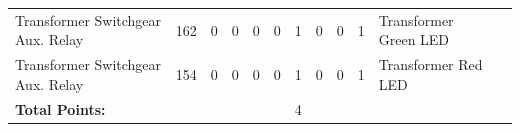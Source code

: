 \begin{table}[!htp]
{\begin{tabular}{lcccccccccll}
			Transformer Switchgear Aux. Relay          & 162                     & 0                                           & 0                                          & 0           & 0           & 1            & 0                & 0 & 1                            & Transformer Green LED            &                \\
			Transformer Switchgear Aux. Relay          & 154                     & 0                                           & 0                                          & 0           & 0           & 1            & 0                & 0 & 1                            & Transformer Red LED              &                \\ \midrule
			\textbf{Total Points:}                     &                         &                                             &                                            &             &             & 4            &                  &   &                              &                                  &                \\ \bottomrule
		\end{tabular}
	}
\end{table}
